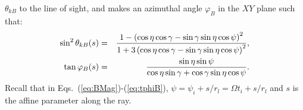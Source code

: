 \documentclass[useAMS,onecolumn,usenatbib,usegraphicx]{mn2e}
\begin{document}
$\theta_{kB}$ to the line of sight, and makes an azimuthal angle
$\varphi_B$ in the $XY$ plane such that:
\begin{eqnarray}
\label{eq:cthkB}
\sin^2\theta_{kB}(s) & = &
{1-\left(\cos\eta\cos\gamma-\sin\gamma\sin\eta\cos\psi
\right)^2\over 1+3\left(\cos\eta\cos\gamma-\sin\gamma\sin\eta\cos\psi
\right)^2},\\
\label{eq:tphiB}
\tan\varphi_B(s)& = & {\sin\eta\sin\psi
\over \cos\eta\sin\gamma+\cos\gamma\sin\eta\cos\psi}.
\end{eqnarray}
Recall that in Eqs.~(\ref{eq:BMag})-(\ref{eq:tphiB}), $\psi=\psi_i+s/r_l
=\Omega t_i+s/r_l$ and $s$ is the affine parameter along the ray.
\end{document}
